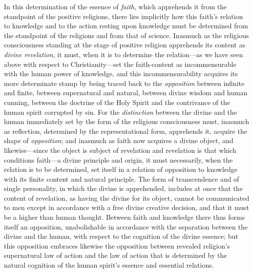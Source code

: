 \documentclass[12pt,a4paper]{book}
\begin{document}
In this determination of the essence of \emph{faith}, which apprehends it from the
standpoint of the positive religions, there lies implicitly how this faith's
relation to knowledge and to the action resting upon knowledge must be determined
from the standpoint of the religions and from that of science. Inasmuch as the
religious consciousness standing at the stage of positive religion apprehends its
content as \emph{divine revelation}, it must, when it is to determine the
relation---as we have seen above with respect to Christianity---set the
faith-content as incommensurable with the human power of knowledge, and this
incommensurability acquires its more determinate stamp by being traced back to the
\emph{opposition} between infinite and finite, between supernatural and natural, between
divine wisdom and human cunning, between the doctrine of the Holy Spirit and the
contrivance of the human spirit corrupted by sin. For the \emph{distinction} between the
divine and the human immediately set by the form of the religious consciousness
must, inasmuch as reflection, determined by the representational form, apprehends
it, acquire the shape of \emph{opposition}; and inasmuch as faith now acquires a divine
object, and likewise---since the object is subject of revelation and revelation is
that which conditions faith---a divine principle and origin, it must necessarily,
when the relation is to be determined, set itself in a relation of opposition to
knowledge with its finite content and natural principle. The form of transcendence
and of single personality, in which the divine is apprehended, includes at once
that the content of revelation, as having the divine for its object, cannot be
communicated to men except in accordance with a free divine creative decision, and
that it must be a higher than human thought.
Between faith and knowledge there thus forms itself an opposition, unabolishable in
accordance with the separation between the divine and the human, with respect to
the cognition of the divine essence; but this opposition embraces likewise the
opposition between revealed religion's supernatural law of action and the law of
action that is determined by the natural cognition of the human spirit's essence
and essential relations.
\end{document}
